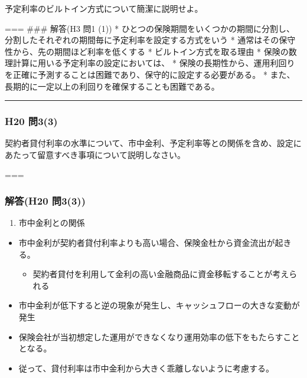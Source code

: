 \documentclass[
]{article}
\providecommand{\tightlist}{%
  \setlength{\itemsep}{0pt}\setlength{\parskip}{0pt}}
\begin{document}
予定利率のビルトイン方式について簡潔に説明せよ。

=== \#\#\# 解答(H3 問1 (1)) *
ひとつの保険期間をいくつかの期間に分割し、分割したそれぞれの期間毎に予定利率を設定する方式をいう
* 通常はその保守性から、先の期間ほど利率を低くする *
ビルトイン方式を取る理由 *
保険の数理計算に用いる予定利率の設定においては、 *
保険の長期性から、運用利回りを正確に予測することは困難であり、保守的に設定する必要がある。
* また、長期的に一定以上の利回りを確保することも困難である。

\begin{center}\rule{0.5\linewidth}{0.5pt}\end{center}

\hypertarget{h20-ux554f33}{%
\subsubsection{H20 問3(3)}\label{h20-ux554f33}}

契約者貸付利率の水準について、市中金利、予定利率等との関係を含め、設定にあたって留意すべき事項について説明しなさい。

===

\hypertarget{ux89e3ux7b54h20-ux554f33}{%
\subsubsection{解答(H20 問3(3))}\label{ux89e3ux7b54h20-ux554f33}}

\begin{enumerate}
\def\labelenumi{\arabic{enumi}.}
\tightlist
\item
  市中金利との関係
\end{enumerate}

\begin{itemize}
\tightlist
\item
  市中金利が契約者貸付利率よりも高い場合、保険金杜から資金流出が起きる。

  \begin{itemize}
  \tightlist
  \item
    契約者貸付を利用して金利の高い金融商品に資金移転することが考えられる
  \end{itemize}
\item
  市中金利が低下すると逆の現象が発生し、キャッシュフローの大きな変動が発生
\item
  保険会社が当初想定した運用ができなくなり運用効率の低下をもたらすこととなる。
\item
  従って、貸付利率は市中金利から大きく乖離しないように考慮する。
\end{itemize}
\end{document}
